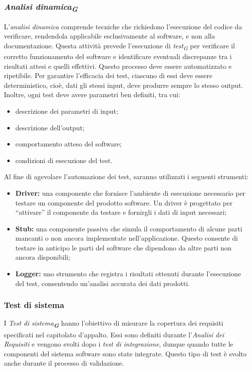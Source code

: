 \subsubsection{\emph{Analisi dinamica}\textsubscript{\textit{\textbf{G}}}}
L'\emph{analisi dinamica} comprende tecniche che richiedono l'esecuzione del codice da verificare, rendendola applicabile esclusivamente al software, e non alla documentazione. 
Questa attività prevede l'esecuzione di \emph{test}\textsubscript{\textit{G}} per verificare il corretto funzionamento del software e identificare eventuali discrepanze tra i risultati attesi e quelli effettivi. Questo processo deve essere automatizzato e ripetibile. 
Per garantire l'efficacia dei test, ciascuno di essi deve essere deterministico, cioè, dati gli stessi input, deve produrre sempre lo stesso output. 
Inoltre, ogni test deve avere parametri ben definiti, tra cui:
\begin{itemize}
    \item descrizione dei parametri di input;
    \item descrizione dell'output;
    \item comportamento atteso del software;
    \item condizioni di esecuzione del test.
\end{itemize}
Al fine di agevolare l’automazione dei test, saranno utilizzati i seguenti strumenti:
\begin{itemize}
    \item \textbf{Driver:} una componente che fornisce l’ambiente di esecuzione necessario per testare un componente del prodotto software. Un driver è progettato per “attivare” il componente da testare e fornirgli i dati di input necessari;
    \item \textbf{Stub:} una componente passiva che simula il comportamento di alcune parti mancanti o non ancora implementate nell’applicazione. Questo consente di testare in anticipo le parti del software che dipendono da altre parti non ancora disponibili;
    \item \textbf{Logger:} uno strumento che registra i risultati ottenuti durante l’esecuzione del test, consentendo un’analisi accurata dei dati prodotti.
\end{itemize}

\subsubsection{Test di sistema}
I \emph{Test di sistema}\textsubscript{\textit{\textbf{G}}} hanno l’obiettivo di misurare la copertura dei requisiti specificati nel
capitolato d’appalto. Essi sono definiti durante l’\emph{Analisi dei Requisiti} e vengono svolti dopo
i \emph{test di integrazione}, dunque quando tutte le componenti del sistema software sono state
integrate. Questo tipo di test è svolto anche durante il processo di validazione.

